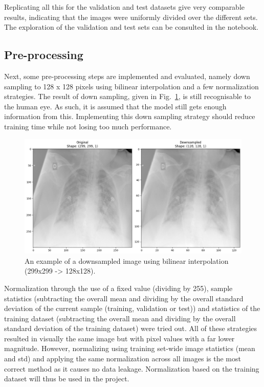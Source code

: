 \documentclass[conference]{IEEEtran}
\begin{document}
Replicating all this for the validation and test datasets give very comparable results, indicating that the images were uniformly divided over the different sets. The exploration of the validation and test sets can be consulted in the notebook.

\subsection{Pre-processing}
Next, some pre-processing steps are implemented and evaluated, namely down sampling to 128 x 128 pixels using bilinear interpolation and a few normalization strategies. The result of down sampling, given in Fig.~\ref{fig:downsample}, is still recognisable to the human eye. As such, it is assumed that the model still gets enough information from this. Implementing this down sampling strategy should reduce training time while not losing too much performance.

\begin{figure}[htbp]
\centerline{\includegraphics[width=\linewidth]{Images/downsample.png}}
\caption{An example of a downsampled image using bilinear interpolation (299x299 -> 128x128).}
\label{fig:downsample}
\end{figure}

Normalization through the use of a fixed value (dividing by 255), sample statistics (subtracting the overall mean and dividing by the overall standard deviation of the current sample (training, validation or test)) and statistics of the training dataset (subtracting the overall mean and dividing by the overall standard deviation of the training dataset) were tried out. All of these strategies resulted in visually the same image but with pixel values with a far lower magnitude. However, normalizing using training set-wide image statistics (mean and std) and applying the same normalization across all images is the most correct method as it causes no data leakage. Normalization based on the training dataset will thus be used in the project.  
\end{document}
